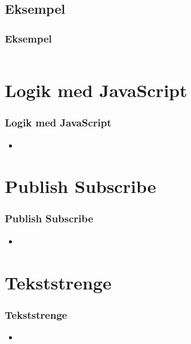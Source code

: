 \subsection{Eksempel}
\begin{frame}
    \frametitle{Eksempel}
    \inputminted[breaklines=true]{html}{../src/frontend/iteration2_html/index.html}
\end{frame}

\section{Logik med JavaScript}
\begin{frame}
    \frametitle{Logik med JavaScript}
    \begin{itemize}
      \item 
    \end{itemize}
\end{frame}

\section{Publish Subscribe}
\begin{frame}
    \frametitle{Publish Subscribe}
    \begin{itemize}
      \item 
    \end{itemize}
\end{frame}

\section{Tekststrenge}
\begin{frame}
    \frametitle{Tekststrenge}
    \begin{itemize}
      \item 
    \end{itemize}
\end{frame}

